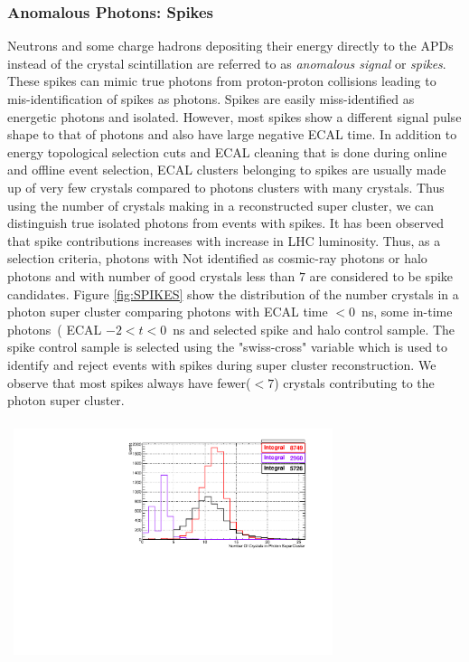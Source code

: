 \subsubsection{Anomalous Photons: Spikes}
Neutrons and some charge hadrons depositing their energy directly to the APDs instead of the crystal scintillation are referred to as \textit{anomalous signal} or \textit{spikes}. These spikes can mimic true photons from proton-proton collisions  leading to mis-identification of spikes as photons. Spikes are easily miss-identified as energetic photons and isolated. However, most spikes show a different signal pulse shape to that of photons and also have large negative ECAL time. In addition to energy topological selection cuts and ECAL cleaning that is done during online and offline event selection, ECAL clusters belonging to spikes are usually made up of very few crystals compared to photons clusters with many crystals. Thus using the number of crystals making in a reconstructed super cluster, we can distinguish true isolated photons from events with spikes. It has been observed that spike contributions increases with increase in LHC luminosity. Thus, as a selection criteria, photons with  Not identified as cosmic-ray photons or halo photons and with number of good crystals less than $7$ are considered to be spike candidates. Figure \ref{fig:SPIKES} show the distribution of the number crystals in a photon super cluster comparing photons with ECAL time $ < 0$~ns, some in-time photons~( ECAL $ -2 < t < 0$~ns and  selected spike and halo control sample. The spike control sample is selected using the "swiss-cross" variable which is used to identify and reject events with spikes during super cluster reconstruction. We observe that most spikes always have fewer($ < 7$) crystals contributing to the photon super cluster.

\begin{center}
\centering
\mbox{
\includegraphics[height=7cm, width=0.7\textwidth]{THESISPLOTS/Number-Of-Crystals-In-Photon-SC.pdf}}
\label{fig:SPIKES}
\end{center}


